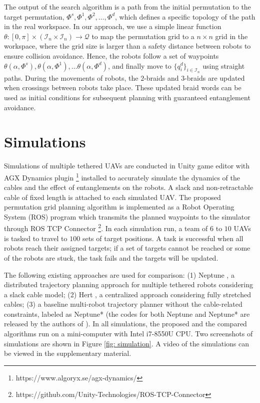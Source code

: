 \documentclass[conference]{IEEEtran}
\newcommand*{\myset}[1]{\mathcal{#1}} %
\newcommand*{\workspace}{\myset{Q}} %
\newcommand*{\config}{q} %
\newcommand*{\projang}{\alpha} %
\newcommand*{\permposset}{\Phi}
\newcommand*{\mapping}{\theta}
\begin{document}
The output of the search algorithm is a path from the initial permutation to the target permutation, $\permposset^s,\permposset^1,\permposset^2,\dots,\permposset^d$,
which defines a specific topology of the path in the real workspace.
In our approach, we use a simple linear function $\mapping:[0,\pi]\times(\myset{I}_n\times\myset{I}_n)\rightarrow\workspace$ to map the permutation grid to a $n\times n$ grid in the workspace, where the grid size is larger than a safety distance between robots to ensure collision avoidance.
Hence, the robots follow a set of waypoints $\mapping(\alpha,\permposset^s),\mapping(\alpha,\permposset^1),\dots\mapping(\alpha,\permposset^d)$, and finally move to $\{\config_i^d\}_{i\in\myset{I}_n}$ using straight paths.
During the movements of robots, the $2$-braids and $3$-braids are updated when crossings between robots take place.
These updated braid words can be used as initial conditions for subsequent planning with guaranteed entanglement avoidance.

\section{Simulations}\label{sec:simulation}
Simulations of multiple tethered UAVs are conducted in Unity game editor with AGX Dynamics plugin \footnote{https://www.algoryx.se/agx-dynamics/} installed to accurately simulate the dynamics of the cables and the effect of entanglements on the robots.
A slack and non-retractable cable of fixed length is attached to each simulated UAV.
The proposed permutation grid planning algorithm is implemented as a Robot Operating System (ROS) program which transmits the planned waypoints to the simulator through ROS TCP Connector \footnote{https://github.com/Unity-Technologies/ROS-TCP-Connector}.
In each simulation run, a team of $6$ to $10$ UAVs is tasked to travel to $100$ sets of target positions.
A task is successful when all robots reach their assigned targets;
if a set of targets cannot be reached or some of the robots are stuck, the task fails and the targets will be updated.


The following existing approaches are used for comparison: (1) Neptune \cite{cao2022neptune}, a distributed trajectory planning approach for multiple tethered robots considering a slack cable model; (2) Hert \cite{hert1999motion}, a centralized approach considering fully stretched cables; 
(3) a baseline multi-robot trajectory planner without the cable-related constraints, labeled as Neptune* 
(the codes for both Neptune and Neptune* are released by the authors of \cite{cao2022neptune}).
In all simulations, the proposed and the compared algorithms run on a mini-computer with Intel i7-8550U CPU.
Two screenshots of simulations are shown in Figure \ref{fig: simulation}.
A video of the simulations can be viewed in the supplementary material.
\end{document}
